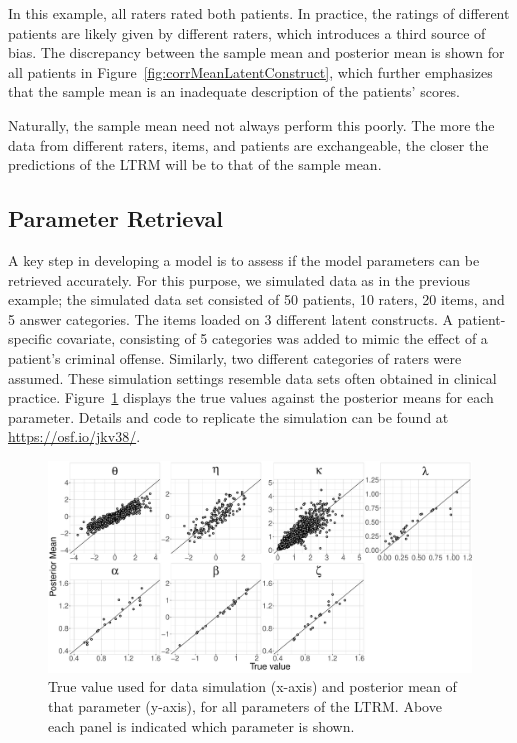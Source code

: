 \documentclass[a4paper,usenames,dvipsnames]{article}
\newenvironment{revision}{\color{teal}}{\color{black}}
\newcommand{\osflink}{\url{https://osf.io/jkv38/}}
\begin{document}
In this example, all raters rated both patients. In practice, the ratings of different patients are likely given by different raters, which introduces a third source of bias. The discrepancy between the sample mean and posterior mean is shown for all patients in Figure~\ref{fig:corrMeanLatentConstruct}, which further emphasizes that the sample mean is an inadequate description of the patients' scores.

\begin{revision}Naturally, the sample mean need not always perform this poorly. The more the data from different raters, items, and patients are exchangeable, the closer the predictions of the LTRM  will be to that of the sample mean.\end{revision}

\subsection*{Parameter Retrieval}
A key step in developing a model is to assess if the model parameters can be retrieved accurately. For this purpose, we simulated data as in the previous example; the simulated data set consisted of 50 patients, 10 raters, 20 items, and 5 answer categories. The items loaded on 3 different latent constructs. A patient-specific covariate, consisting of 5 categories was added to mimic the effect of a patient's criminal offense. Similarly, two different categories of raters were assumed. \begin{revision}These simulation settings resemble data sets often obtained in clinical practice.\end{revision} Figure~\ref{fig:parameterRecoveryELTRM} displays the true values against the posterior means for each parameter. Details and code to replicate the simulation can be found at \osflink{}.
\begin{figure}[!ht]
	\centering
	\includegraphics[width= \textwidth]{figures/parameterRecoveryModel2.pdf}
	\caption{True value used for data simulation (x-axis) and posterior mean of that parameter (y-axis), for all parameters of the LTRM. Above each panel is indicated which parameter is shown.}
	\label{fig:parameterRecoveryELTRM}
\end{figure}
\end{document}
